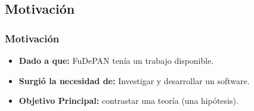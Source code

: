 \subsection{Motivación}
  \begin{frame}\frametitle{\textbf{Motivación}}      
    \begin{itemize}
      \item \textbf{Dado a que:}
        FuDePAN tenía un trabajo disponible.
      \item \textbf{Surgió la necesidad de:}
        Investigar y desarrollar un software.
      \item \textbf{Objetivo Principal:}
        contrastar una teoría (una hipótesis).
    \end{itemize}

    \begin{minipage}{3cm \textwidth}
\end{minipage}
\end{frame}
